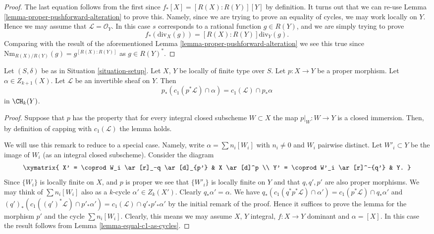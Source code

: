 \begin{proof}
The last equation follows from the first since $f_*[X] = [R(X) : R(Y)][Y]$
by definition. It turns out that we can re-use
Lemma \ref{lemma-proper-pushforward-alteration}
to prove this. Namely, since we are trying to prove an equality
of cycles, we may work locally on $Y$. Hence we may assume
that $\mathcal{L} = \mathcal{O}_Y$. In this case $s$
corresponds to a rational function $g \in R(Y)$, and
we are simply trying to prove
$$
f_*\left(\text{div}_X(g)\right) =
[R(X) : R(Y)]\text{div}_Y(g).
$$
Comparing with the result of the aforementioned
Lemma \ref{lemma-proper-pushforward-alteration}
we see this true since
$\text{Nm}_{R(X)/R(Y)}(g) = g^{[R(X) : R(Y)]}$
as $g \in R(Y)^*$.
\end{proof}

\begin{lemma}
\label{lemma-pushforward-cap-c1}
Let $(S, \delta)$ be as in Situation \ref{situation-setup}.
Let $X$, $Y$ be locally of finite type over $S$.
Let $p : X \to Y$ be a proper morphism.
Let $\alpha \in Z_{k + 1}(X)$.
Let $\mathcal{L}$ be an invertible sheaf on $Y$.
Then
$$
p_*(c_1(p^*\mathcal{L}) \cap \alpha) = c_1(\mathcal{L}) \cap p_*\alpha
$$
in $\CH_k(Y)$.
\end{lemma}

\begin{proof}
Suppose that $p$ has the property that for every integral
closed subscheme $W \subset X$ the map $p|_W : W \to Y$
is a closed immersion. Then, by definition of capping
with $c_1(\mathcal{L})$ the lemma holds.

\medskip\noindent
We will use this remark to reduce to a special case. Namely,
write $\alpha = \sum n_i[W_i]$ with $n_i \not = 0$ and $W_i$ pairwise
distinct. Let $W'_i \subset Y$ be the image of $W_i$ (as an integral
closed subscheme). Consider the diagram
$$
\xymatrix{
X' = \coprod W_i \ar[r]_-q \ar[d]_{p'} & X \ar[d]^p \\
Y' = \coprod W'_i \ar[r]^-{q'} & Y.
}
$$
Since $\{W_i\}$ is locally finite on $X$, and $p$ is proper
we see that $\{W'_i\}$ is locally finite on $Y$ and that
$q, q', p'$ are also proper morphisms.
We may think of $\sum n_i[W_i]$ also as a $k$-cycle
$\alpha' \in Z_k(X')$. Clearly $q_*\alpha' = \alpha$.
We have
$q_*(c_1(q^*p^*\mathcal{L}) \cap \alpha')
= c_1(p^*\mathcal{L}) \cap q_*\alpha'$
and
$(q')_*(c_1((q')^*\mathcal{L}) \cap p'_*\alpha') =
c_1(\mathcal{L}) \cap q'_*p'_*\alpha'$ by the initial
remark of the proof. Hence it suffices to prove the lemma
for the morphism $p'$ and the cycle $\sum n_i[W_i]$.
Clearly, this means we may assume $X$, $Y$ integral,
$f : X \to Y$ dominant and $\alpha = [X]$.
In this case the result follows from
Lemma \ref{lemma-equal-c1-as-cycles}.
\end{proof}






